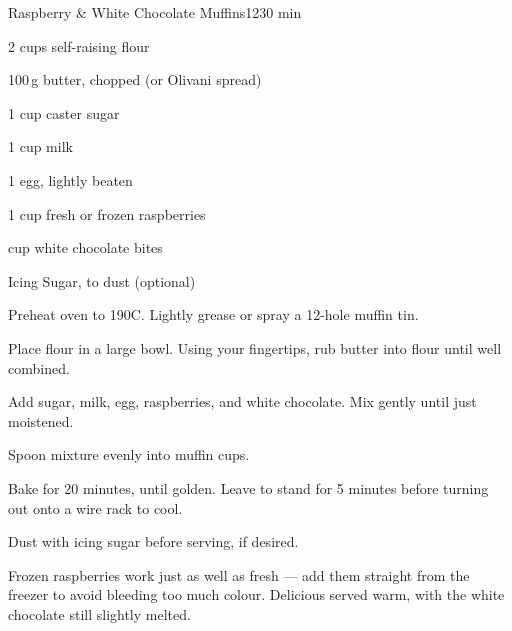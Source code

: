 \begin{recipebox}{Raspberry \& White Chocolate Muffins}{12}{30 min}
\begin{ingredients}
  \item 2 cups self-raising flour
  \item 100\,g butter, chopped (or Olivani spread)
  \item 1 cup caster sugar
  \item 1 cup milk
  \item 1 egg, lightly beaten
  \item 1 cup fresh or frozen raspberries
  \item {} cup white chocolate bites
  \item Icing Sugar, to dust (optional)
\end{ingredients}

\begin{method}
  \item Preheat oven to 190\degree C. Lightly grease or spray a 12-hole muffin tin.
  \item Place flour in a large bowl. Using your fingertips, rub butter into flour until well combined.
  \item Add sugar, milk, egg, raspberries, and white chocolate. Mix gently until just moistened.
  \item Spoon mixture evenly into muffin cups.
  \item Bake for 20 minutes, until golden. Leave to stand for 5 minutes before turning out onto a wire rack to cool.
  \item Dust with icing sugar before serving, if desired.
\end{method}

\begin{notes}
Frozen raspberries work just as well as fresh — add them straight from the freezer to avoid bleeding too much colour.  
Delicious served warm, with the white chocolate still slightly melted.  
\end{notes}
\end{recipebox}
